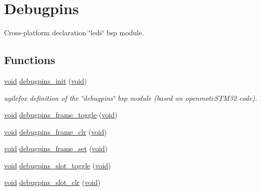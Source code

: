 \hypertarget{group__debugpins}{}\section{Debugpins}
\label{group__debugpins}


Cross-\/platform declaration \char`\"{}leds\char`\"{} bsp module.  


\subsection*{Functions}
\begin{DoxyCompactItemize}
\item 
\hyperlink{usb__devapi_8h_afabf60e7f57651d6d595a02c75f07cd0}{void} \hyperlink{group__debugpins_ga67b42e8786576ba76a5dbfd6b61bbf90}{debugpins\+\_\+init} (\hyperlink{usb__devapi_8h_afabf60e7f57651d6d595a02c75f07cd0}{void})
\begin{DoxyCompactList}\small\item\em agilefox definition of the \char`\"{}debugpins\char`\"{} bsp module (based on openmote\+S\+T\+M32 code). \end{DoxyCompactList}\item 
\hyperlink{usb__devapi_8h_afabf60e7f57651d6d595a02c75f07cd0}{void} \hyperlink{group__debugpins_gaf5f2b7fbde11bd076c0c3e867653fa08}{debugpins\+\_\+frame\+\_\+toggle} (\hyperlink{usb__devapi_8h_afabf60e7f57651d6d595a02c75f07cd0}{void})
\item 
\hyperlink{usb__devapi_8h_afabf60e7f57651d6d595a02c75f07cd0}{void} \hyperlink{group__debugpins_gada37390552bee362863d82aa858f7aed}{debugpins\+\_\+frame\+\_\+clr} (\hyperlink{usb__devapi_8h_afabf60e7f57651d6d595a02c75f07cd0}{void})
\item 
\hyperlink{usb__devapi_8h_afabf60e7f57651d6d595a02c75f07cd0}{void} \hyperlink{group__debugpins_ga2a1a3edef66d4588cb179ee254935790}{debugpins\+\_\+frame\+\_\+set} (\hyperlink{usb__devapi_8h_afabf60e7f57651d6d595a02c75f07cd0}{void})
\item 
\hyperlink{usb__devapi_8h_afabf60e7f57651d6d595a02c75f07cd0}{void} \hyperlink{group__debugpins_gaa50950bd15a2a2ad12412ab5fbf0eb12}{debugpins\+\_\+slot\+\_\+toggle} (\hyperlink{usb__devapi_8h_afabf60e7f57651d6d595a02c75f07cd0}{void})
\item 
\hyperlink{usb__devapi_8h_afabf60e7f57651d6d595a02c75f07cd0}{void} \hyperlink{group__debugpins_ga46be7a970bd088dbf58868c806a90ff6}{debugpins\+\_\+slot\+\_\+clr} (\hyperlink{usb__devapi_8h_afabf60e7f57651d6d595a02c75f07cd0}{void})

\end{DoxyCompactItemize}
